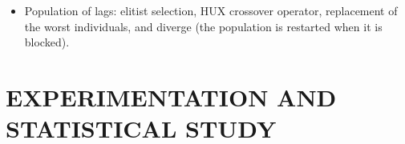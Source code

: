 \documentclass[a4paper,twoside]{article}
\begin{document}
\begin{itemize}
  \item{Population of lags:} elitist selection, HUX crossover operator, replacement of the worst individuals, and diverge (the population is restarted when it is blocked).
%
%
%
%
\end{itemize}




\section{\uppercase{Experimentation and statistical study}}
\label{sec:experimentation}
\end{document}
